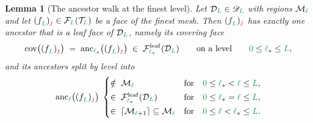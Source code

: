 \documentclass[a4paper, 12pt]{article}
\makeatletter
\newcommand{\lstar}{\l_{\ast}}
\newcommand{\green}{\color{ForestGreen}}
\newcommand{\brickred}{\color{BrickRed}}
\newcommand{\T}{\mathcal{T}}
\newcommand{\F}{\mathcal{F}}
\newcommand{\face}[2]{\freeQ{f}{}{#1}{#2}}
\newcommand{\fineIdxone}{{\brickred j}}
\renewcommand{\l}{{\green\ell}}
\renewcommand{\L}{{\green L}}
\newcommand{\lzero}{{\green 0}}
\newcommand{\freeQ}[4]{ ( {#1}^{#2}_{#3} )_{#4}}
\newcommand{\M}{\mathcal{M}}
\newtheorem{lemma}[theorem]{Lemma}
\theoremstyle{definition}
\theoremstyle{plain}
\numberwithin{equation}{section}
\newcommand{\ancestorPatch}[1]{\lceil #1 \rceil}
\DeclareRobustCommand{\domseq}[1][]{\mathcal{D}\ifx\@empty#1\@empty\else_{#1}\fi}
\newcommand{\alldomseqs}{\mathscr{D}}
\newcommand{\leafF}[1]{\F^{\mathrm{leaf}}_{#1}}             %
\newcommand{\anc}[1]{\mathrm{anc}_{#1}}                     %
\newcommand{\coveringFace}{\mathrm{cov}}                    %
\makeatother
\begin{document}
\begin{lemma}[The ancestor walk at the finest level]
    \label{lemma:ancestor_walk_finest}
    Let $\domseq[\L] \in \alldomseqs_\L$ with regions $\M_\l$ and let $\face{\L}{\fineIdxone} \in \F_\L(\T_\L)$ be a face of the finest mesh. Then $\face{\L}{\fineIdxone}$ has exactly one ancestor that is a leaf face of $\domseq[\L]$, namely its covering face
    \begin{equation}
        \label{eq:covering_face_at_finest}
        \coveringFace \big( \face{\L}{\fineIdxone} \big) \; = \; \anc{\lstar} \big( \face{\L}{\fineIdxone} \big) \; \in \; \leafF{\lstar}(\domseq[\L]) \qquad \text{on a level} \qquad \lzero \leq \lstar \leq \L ,
    \end{equation}
    and its ancestors split by level into
    \begin{equation}
        \label{eq:ancestor_walk}
        \anc{\l} \big( \face{\L}{\fineIdxone} \big) \; \begin{cases}
            \notin \; \M_\l & \text{for} \quad \lzero \leq \lstar < \l \leq \L , \\[2pt]
            \in \; \leafF{\lstar}(\domseq[\L]) & \text{for} \quad \lzero \leq \lstar = \l \leq \L , \\[2pt]
            \in \; \ancestorPatch{\M_{\l+1}} \subseteq \M_{\l} & \text{for} \quad \lzero \leq \l < \lstar \leq \L .
        \end{cases}
    \end{equation}
\end{lemma}
\end{document}
